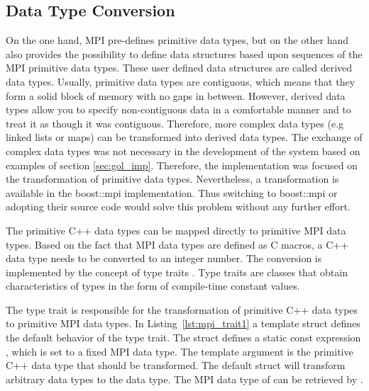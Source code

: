 \subsection{Data Type Conversion}
\label{sec:data_type_conversion}
On the one hand, MPI pre-defines primitive data types, but on the
other hand also provides the possibility to define data structures
based upon sequences of the MPI primitive data types. These user
defined data structures are called derived data types. Usually,
primitive data types are contiguous, which means that they form a
solid block of memory with no gaps in between. However, derived data
types allow you to specify non-contiguous data in a comfortable manner
and to treat it as though it was contiguous.  Therefore, more complex
data types (e.g linked lists or maps) can be transformed into derived
data types. The exchange of complex data types was not necessary in
the development of the system based on examples of section
\ref{sec:gol_imp}. Therefore, the implementation was focused on the
transformation of primitive data types.  Nevertheless, a
transformation is available in the boost::mpi \cite{ref:boost_mpi}
implementation. Thus switching to boost::mpi or adopting their source
code would solve this problem without any further effort.

The primitive C++ data types can be mapped directly to primitive MPI
data types. Based on the fact that MPI data types are defined as C macros,
a C++ data type needs to be converted to an integer number. The
conversion is implemented by the concept of type traits
\cite{ref:type_trait}.  Type traits are classes that obtain
characteristics of types in the form of compile-time constant values.

The type trait is responsible for the transformation of primitive C++
data types to primitive MPI data types.  In
Listing~\ref{lst:mpi_trait1} a template struct defines the default
behavior of the type trait. The struct defines a static const
expression , which is set to a fixed MPI data type. The
template argument  is the primitive C++ data type that
should be transformed. The default struct will transform arbitrary
data types  to the  data type. The MPI data
type of  can be retrieved by
.


